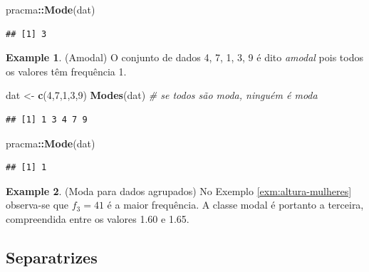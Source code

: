 \documentclass[
]{book}
\newenvironment{Shaded}{\begin{snugshade}}{\end{snugshade}}
\newcommand{\CommentTok}[1]{\textcolor[rgb]{0.56,0.35,0.01}{\textit{#1}}}
\newcommand{\DecValTok}[1]{\textcolor[rgb]{0.00,0.00,0.81}{#1}}
\newcommand{\KeywordTok}[1]{\textcolor[rgb]{0.13,0.29,0.53}{\textbf{#1}}}
\newcommand{\NormalTok}[1]{#1}
\newcommand{\OperatorTok}[1]{\textcolor[rgb]{0.81,0.36,0.00}{\textbf{#1}}}
\newcommand{\StringTok}[1]{\textcolor[rgb]{0.31,0.60,0.02}{#1}}
\theoremstyle{definition}
\theoremstyle{definition}
\newtheorem{example}{Example}[chapter]
\theoremstyle{definition}
\theoremstyle{remark}
\begin{document}
\begin{Shaded}
\begin{Highlighting}[]
\NormalTok{pracma}\OperatorTok{::}\KeywordTok{Mode}\NormalTok{(dat)}
\end{Highlighting}
\end{Shaded}

\begin{verbatim}
## [1] 3
\end{verbatim}

\begin{example}
\protect\hypertarget{exm:moda3}{}{\label{exm:moda3} }(Amodal) O conjunto de dados 4, 7, 1, 3, 9 é dito \emph{amodal} pois todos os valores têm frequência 1.
\end{example}

\begin{Shaded}
\begin{Highlighting}[]
\NormalTok{dat \textless{}{-}}\StringTok{ }\KeywordTok{c}\NormalTok{(}\DecValTok{4}\NormalTok{,}\DecValTok{7}\NormalTok{,}\DecValTok{1}\NormalTok{,}\DecValTok{3}\NormalTok{,}\DecValTok{9}\NormalTok{)}
\KeywordTok{Modes}\NormalTok{(dat)    }\CommentTok{\# se todos são moda, ninguém é moda}
\end{Highlighting}
\end{Shaded}

\begin{verbatim}
## [1] 1 3 4 7 9
\end{verbatim}

\begin{Shaded}
\begin{Highlighting}[]
\NormalTok{pracma}\OperatorTok{::}\KeywordTok{Mode}\NormalTok{(dat)}
\end{Highlighting}
\end{Shaded}

\begin{verbatim}
## [1] 1
\end{verbatim}

\begin{example}
\protect\hypertarget{exm:moda4}{}{\label{exm:moda4} }(Moda para dados agrupados) No Exemplo \ref{exm:altura-mulheres} observa-se que \(f_{3}=41\) é a maior frequência. A classe modal é portanto a terceira, compreendida entre os valores 1.60 e 1.65.
\end{example}

\hypertarget{separatrizes}{%
\subsection{Separatrizes}\label{separatrizes}}
\end{document}

